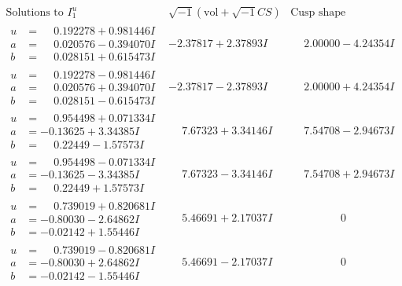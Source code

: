 \documentclass[1p]{elsarticle_modified}
\theoremstyle{definition}
\newcommand{\I}{\sqrt{-1}}
\begin{document}
$$\begin{array}{c|c|c}  
\text{Solutions to }I^u_{1}& \I (\text{vol} + \sqrt{-1}CS) & \text{Cusp shape}\\
 \hline 
\begin{aligned}
u &= \phantom{-}0.192278 + 0.981446 I \\
a &= \phantom{-}0.020576 - 0.394070 I \\
b &= \phantom{-}0.028151 + 0.615473 I\end{aligned}
 & -2.37817 + 2.37893 I & \phantom{-}2.00000 - 4.24354 I \\ \hline\begin{aligned}
u &= \phantom{-}0.192278 - 0.981446 I \\
a &= \phantom{-}0.020576 + 0.394070 I \\
b &= \phantom{-}0.028151 - 0.615473 I\end{aligned}
 & -2.37817 - 2.37893 I & \phantom{-}2.00000 + 4.24354 I \\ \hline\begin{aligned}
u &= \phantom{-}0.954498 + 0.071334 I \\
a &= -0.13625 + 3.34385 I \\
b &= \phantom{-}0.22449 - 1.57573 I\end{aligned}
 & \phantom{-}7.67323 + 3.34146 I & \phantom{-}7.54708 - 2.94673 I \\ \hline\begin{aligned}
u &= \phantom{-}0.954498 - 0.071334 I \\
a &= -0.13625 - 3.34385 I \\
b &= \phantom{-}0.22449 + 1.57573 I\end{aligned}
 & \phantom{-}7.67323 - 3.34146 I & \phantom{-}7.54708 + 2.94673 I \\ \hline\begin{aligned}
u &= \phantom{-}0.739019 + 0.820681 I \\
a &= -0.80030 - 2.64862 I \\
b &= -0.02142 + 1.55446 I\end{aligned}
 & \phantom{-}5.46691 + 2.17037 I & \phantom{-0.000000 } 0 \\ \hline\begin{aligned}
u &= \phantom{-}0.739019 - 0.820681 I \\
a &= -0.80030 + 2.64862 I \\
b &= -0.02142 - 1.55446 I\end{aligned}
 & \phantom{-}5.46691 - 2.17037 I & \phantom{-0.000000 } 0 \\ \hline\begin{aligned}

\end{aligned}
\end{array}$$
\end{document}
